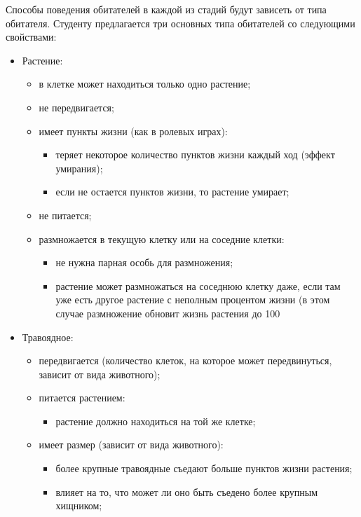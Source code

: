 \documentclass[a4paper,12pt]{article}
\begin{document}
Способы поведения обитателей в каждой из стадий будут зависеть от типа
обитателя. Студенту предлагается три основных типа обитателей со
следующими свойствами:

\begin{itemize}
\item Растение:
  \begin{itemize}
  \item в клетке может находиться только одно растение;
  \item не передвигается;
  \item имеет пункты жизни (как в ролевых играх):
    \begin{itemize}
    \item теряет некоторое количество пунктов жизни каждый ход (эффект
      умирания);
    \item если не остается пунктов жизни, то растение умирает;
    \end{itemize}
  \item не питается;
  \item размножается в текущую клетку или на соседние клетки:
    \begin{itemize}
    \item не нужна парная особь для размножения;
    \item растение может размножаться на соседнюю клетку даже, если
      там уже есть другое растение с неполным процентом жизни (в этом
      случае размножение обновит жизнь растения до 100%
    \end{itemize}
  \end{itemize}

\item Травоядное:
  \begin{itemize}
  \item передвигается (количество клеток, на которое может
    передвинуться, зависит от вида животного);
  \item питается растением:
    \begin{itemize}
    \item растение должно находиться на той же клетке;
    \end{itemize}

  \item имеет размер (зависит от вида животного):
    \begin{itemize}
    \item более крупные травоядные съедают больше пунктов жизни
      растения;
    \item влияет на то, что может ли оно быть съедено более крупным
      хищником;
    \end{itemize}


\end{itemize}
\end{itemize}
\end{document}
